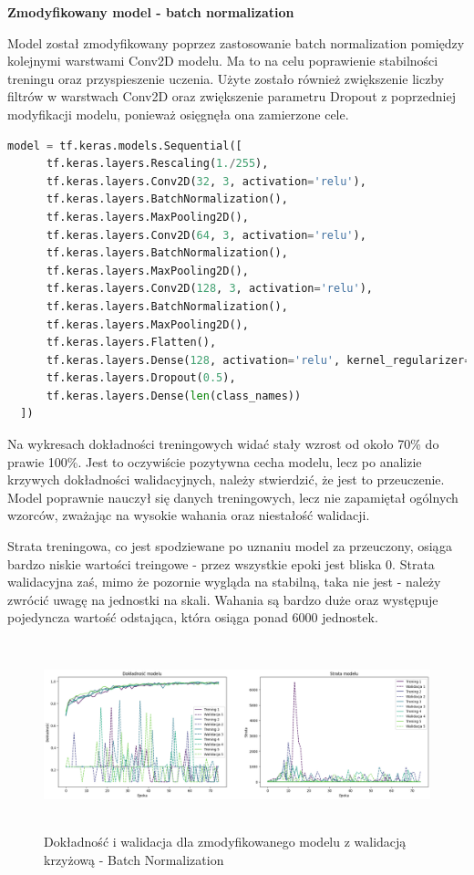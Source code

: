 \textbf{Zmodyfikowany model - batch normalization}

Model został zmodyfikowany poprzez zastosowanie batch normalization pomiędzy kolejnymi warstwami Conv2D modelu.
Ma to na celu poprawienie stabilności treningu oraz przyspieszenie uczenia.
Użyte zostało również zwiększenie liczby filtrów w warstwach Conv2D oraz zwiększenie parametru Dropout
z poprzedniej modyfikacji modelu, ponieważ osięgnęła ona zamierzone cele.

\begin{lstlisting}[language=Python,caption=Listing zmodyfikowanego skryptu tworzącego model z walidacją krzyżową - wersja 2,
	label={tests-model-crossval2}]
	model = tf.keras.models.Sequential([
      tf.keras.layers.Rescaling(1./255),
      tf.keras.layers.Conv2D(32, 3, activation='relu'),
      tf.keras.layers.BatchNormalization(),
      tf.keras.layers.MaxPooling2D(),
      tf.keras.layers.Conv2D(64, 3, activation='relu'),
      tf.keras.layers.BatchNormalization(),
      tf.keras.layers.MaxPooling2D(),
      tf.keras.layers.Conv2D(128, 3, activation='relu'),
      tf.keras.layers.BatchNormalization(),
      tf.keras.layers.MaxPooling2D(),
      tf.keras.layers.Flatten(),
      tf.keras.layers.Dense(128, activation='relu', kernel_regularizer=tf.keras.regularizers.l2(0.01)),
      tf.keras.layers.Dropout(0.5),
      tf.keras.layers.Dense(len(class_names))
  ])
\end{lstlisting}

Na wykresach dokładności treningowych widać stały wzrost od około 70\% do prawie 100\%.
Jest to oczywiście pozytywna cecha modelu, lecz po analizie krzywych dokładności walidacyjnych,
należy stwierdzić, że jest to przeuczenie. Model poprawnie nauczył się danych treningowych,
lecz nie zapamiętał ogólnych wzorców, zważając na wysokie wahania oraz niestałość walidacji.

Strata treningowa, co jest spodziewane po uznaniu model za przeuczony,
osiąga bardzo niskie wartości treingowe - przez wszystkie epoki jest bliska 0.
Strata walidacyjna zaś, mimo że pozornie wygląda na stabilną, taka nie jest
- należy zwrócić uwagę na jednostki na skali. Wahania są bardzo duże oraz występuje pojedyncza wartość odstająca,
która osiąga ponad 6000 jednostek.

\begin{figure}[ht]
	\centering
	\includegraphics[height=5.5cm]{resources/tests/images/v4/crossvalid_2_img.png}
	\caption{Dokładność i walidacja dla zmodyfikowanego modelu z walidacją krzyżową - Batch Normalization}
	\label{Fig:tests-cv-2a}
\end{figure}
\FloatBarrier

